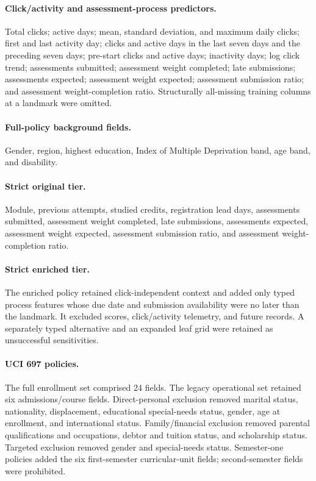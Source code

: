 \documentclass[education,supfile,submit,moreauthors]{Definitions/mdpi}
\begin{document}
\paragraph{Click/activity and assessment-process predictors.}
Total clicks; active days; mean, standard deviation, and maximum daily clicks; first and last activity day; clicks and active days in the last seven days and the preceding seven days; pre-start clicks and active days; inactivity days; log click trend; assessments submitted; assessment weight completed; late submissions; assessments expected; assessment weight expected; assessment submission ratio; and assessment weight-completion ratio. Structurally all-missing training columns at a landmark were omitted.

\paragraph{Full-policy background fields.}
Gender, region, highest education, Index of Multiple Deprivation band, age band, and disability.

\paragraph{Strict original tier.}
Module, previous attempts, studied credits, registration lead days, assessments submitted, assessment weight completed, late submissions, assessments expected, assessment weight expected, assessment submission ratio, and assessment weight-completion ratio.

\paragraph{Strict enriched tier.}
The enriched policy retained click-independent context and added only typed process features whose due date and submission availability were no later than the landmark. It excluded scores, click/activity telemetry, and future records. A separately typed alternative and an expanded leaf grid were retained as unsuccessful sensitivities.

\paragraph{UCI 697 policies.}
The full enrollment set comprised 24 fields. The legacy operational set retained six admissions/course fields. Direct-personal exclusion removed marital status, nationality, displacement, educational special-needs status, gender, age at enrollment, and international status. Family/financial exclusion removed parental qualifications and occupations, debtor and tuition status, and scholarship status. Targeted exclusion removed gender and special-needs status. Semester-one policies added the six first-semester curricular-unit fields; second-semester fields were prohibited.
\end{document}
